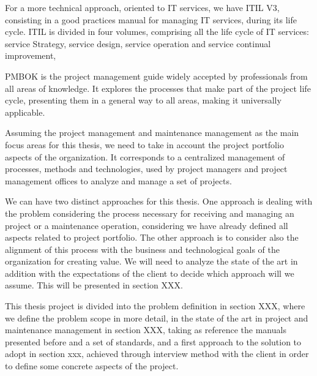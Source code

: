 For a more technical approach, oriented to IT services, we have ITIL V3, consisting in a good practices manual for managing IT services, during its life cycle. ITIL is divided in four volumes, comprising all the life cycle of IT services: service Strategy, service design, service operation and service continual improvement,\par
PMBOK is the project management guide widely accepted by professionals from all areas of knowledge. It explores the processes that make part of the project life cycle, presenting them in a general way to all areas, making it universally applicable.\par
Assuming the project management and maintenance management as the main focus areas for this thesis, we need to take in account the project portfolio aspects of the organization. It corresponds to a centralized management of processes, methods and technologies, used by project managers and project management offices to analyze and manage a set of projects.\par
We can have two distinct approaches for this thesis. One approach is dealing with the problem considering the process necessary for receiving and managing an project or a maintenance operation, considering we have already defined all aspects related to project portfolio. The other approach is to consider also the alignment of this process with the business and technological goals of the organization for creating value. We will need to analyze the state of the art in addition with the expectations of the client to decide which approach will we assume. This will be presented in section XXX.\par
This thesis project is divided into the problem definition in section XXX, where we define the problem scope in more detail, in the state of the art in project and maintenance management in section XXX, taking as reference the manuals presented before and a set of standards, and a first approach to the solution to adopt in section xxx,  achieved through interview method with the client in order to define some concrete aspects of the project.